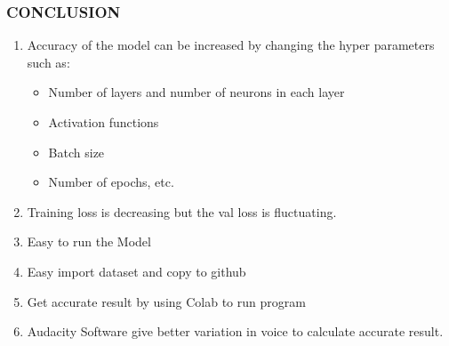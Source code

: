\documentclass{beamer}
\begin{document}
\begin{frame}
 \frametitle{CONCLUSION}   
 \begin{enumerate}
 
 \item Accuracy of the model can be increased by changing the hyper parameters such as:
 
 \begin{itemize}
    \item Number of layers and number of neurons in each layer
    \item Activation functions
    \item Batch size
    \item Number of epochs, etc.
    
    \end{itemize}
    
    \item Training loss is decreasing but the val loss is fluctuating.
    \item Easy to run the Model
    \item Easy import dataset and copy to github
    \item Get accurate result by using Colab to run program
    \item Audacity Software give better variation in voice to calculate accurate result.
 
\end{enumerate}
\end{frame}
\end{document}
